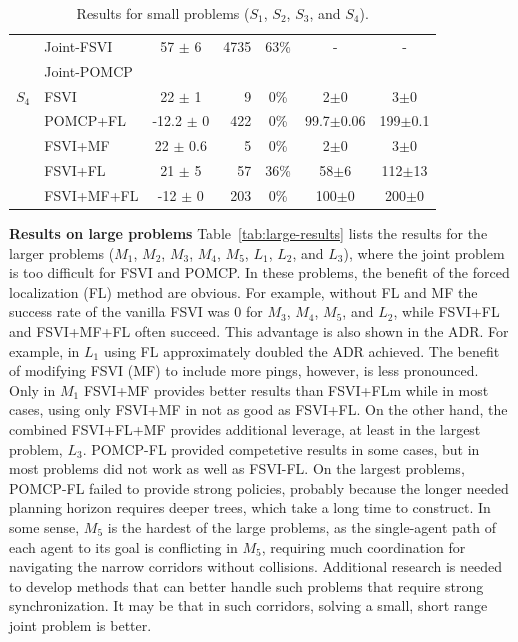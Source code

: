 \documentclass[letterpaper]{article} %
\newcommand{\itay}[1]{}
\begin{document}
\begin{table}
{\begin{tabular}{ |c|l|c|r|c|c|c| }
    \hline
    \hline
    \multirow{5}{*}{$S_4$}
    & Joint-FSVI\itay{+} & 57 $\pm$ 6 & 4735 & 63\% &  - & - \\
    & Joint-POMCP &&&&& \\
    & FSVI\itay{+} & 22 $\pm$ 1 & 9 & 0\% & 2$\pm$0 & 3$\pm$0 \\
    & POMCP+FL\itay{+} & -12.2 $\pm$ 0 & 422 & 0\% & 99.7$\pm$0.06 & 199$\pm$0.1 \\
    & FSVI+MF\itay{+} & 22 $\pm$ 0.6 & 5 & 0\% &  2$\pm$0 & 3$\pm$0 \\
    &FSVI+FL\itay{+} & 21 $\pm$ 5 & 57 & 36\% & 58$\pm$6 & 112$\pm$13 \\
    & FSVI+MF+FL\itay{+} & -12 $\pm$ 0 & 203 & 0\% &  100$\pm$0 & 200$\pm$0 \\
    \hline
    \hline
     \end{tabular}
     }
    \caption{Results for small problems ($S_1$, $S_2$, $S_3$, and $S_4$).\itay{** Average run-time in 200 runs}}
    \label{tab:2small-results}
\end{table}
\noindent\textbf{Results on large problems}
Table~\ref{tab:large-results} lists the results for the larger problems ($M_1$, $M_2$, $M_3$, $M_4$, $M_5$, $L_1$, $L_2$, and $L_3$), where the joint problem is too difficult for FSVI and POMCP.
In these problems, the benefit of the forced localization (FL) method are obvious.
For example, without FL and MF the success rate of the vanilla FSVI was 0 for $M_3$, $M_4$, $M_5$, and $L_2$, while
FSVI+FL and FSVI+MF+FL often succeed. This advantage is also shown in the ADR.
For example, in $L_1$ using FL approximately doubled the ADR achieved.
The benefit of modifying FSVI (MF) to include more pings, however, is less pronounced. Only in $M_1$ FSVI+MF provides better results than FSVI+FLm while in most cases, using only FSVI+MF in not as good as FSVI+FL. On the other hand, the combined FSVI+FL+MF provides additional leverage, at least in the largest problem, $L_3$.
POMCP-FL provided competetive results in some cases, but in most problems did not work as well as FSVI-FL. On the largest problems, POMCP-FL failed to provide strong policies, probably because the longer needed planning horizon requires deeper trees, which take a long time to construct.
In some sense, $M_5$ is the hardest of the large problems, as the single-agent path of each agent to its goal is conflicting in $M_5$, requiring much coordination for navigating the narrow corridors without collisions.
Additional research is needed to develop methods that can better handle such problems that require strong synchronization. It may be that in such corridors, solving a small, short range joint problem is better.
\end{document}
